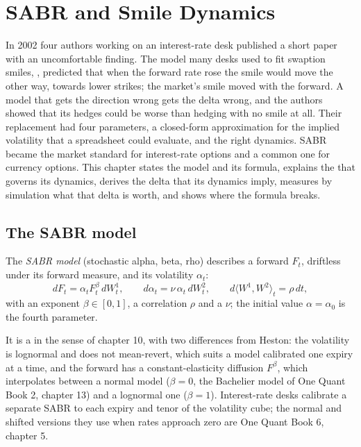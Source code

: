 \chapter{SABR and Smile Dynamics}\label{ch:dv:sabr-and-smile-dynamics}

In 2002 four authors working on an interest-rate desk published a short paper with an
uncomfortable finding. The model many desks used to fit swaption smiles, ,
predicted that when the forward rate rose the smile would move the other way, towards lower
strikes; the market's smile moved with the forward. A model that gets the direction wrong
gets the delta wrong, and the authors showed that its hedges could be worse than hedging with
no smile at all. Their replacement had four parameters, a closed-form approximation for the
implied volatility that a spreadsheet could evaluate, and the right dynamics. SABR became the
market standard for interest-rate options and a common one for currency options. This chapter
states the model and its formula, explains the  that governs its dynamics, derives the
delta that its dynamics imply, measures by simulation what that delta is worth, and shows where
the formula breaks.

\section{The SABR model}

\begin{definition}\label{def:dv:sabr-and-smile-dynamics:sabr}
The \emph{SABR model} (stochastic alpha, beta, rho) describes a forward $F_t$,
driftless under its forward measure, and its volatility $\alpha_t$:
\[
dF_t=\alpha_tF_t^{\beta}\,dW^1_t,\qquad d\alpha_t=\nu\,\alpha_t\,dW^2_t,\qquad
d\langle W^1,W^2\rangle_t=\rho\,dt,
\]
with an exponent $\beta\in[0,1]$, a correlation $\rho$ and a  $\nu$; the
initial value $\alpha=\alpha_0$ is the fourth parameter.
\end{definition}

It is a  in the sense of chapter 10, with two differences from Heston:
the volatility is lognormal and does not mean-revert, which suits a model calibrated one expiry at a
time, and the forward has a constant-elasticity diffusion $F^\beta$, which interpolates between a
normal model ($\beta=0$, the Bachelier model of One Quant Book 2, chapter 13) and a lognormal one
($\beta=1$). Interest-rate desks calibrate a separate SABR to each expiry and tenor of the volatility
cube; the normal and shifted versions they use when rates approach zero are One Quant Book 6,
chapter 5.

